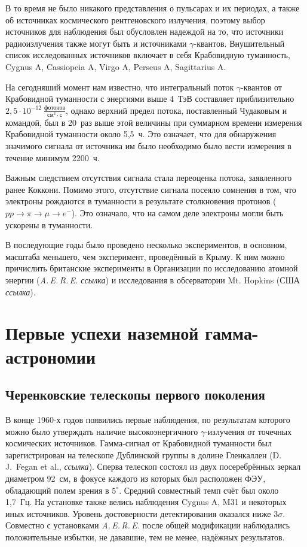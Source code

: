 \documentclass[magd,floatypics,numeref]{msudipl} %
\begin{document}
В то время не было никакого представления о пульсарах и их периодах, а также об источниках космического рентгеновского излучения, поэтому выбор источников для наблюдения был обусловлен надеждой на то, что источники радиоизлучения также могут быть и источниками $\gamma$-квантов. Внушительный список исследованных источников включает в себя Крабовидную туманность, Cygnus A, Cassiopeia A, Virgo A, Perseus A, Sagittarius A. 

На сегодняший момент нам известно, что интегральный поток $\gamma$-квантов от Крабовидной туманности с энергиями выше 4~ТэВ составляет приблизительно~$2,5\cdot10^{-12}~\frac{\text{фотонов}}{\text{см}^2\cdot\text{с}}$, однако верхний предел потока, поставленный Чудаковым и командой, был в 20~раз выше этой величины при суммарном времени измерения Крабовидной туманности около 5,5~ч. Это означает, что для обнаружения значимого сигнала от источника им было необходимо было вести измерения в течение минимум 2200~ч.

Важным следствием отсутствия сигнала стала переоценка потока, заявленного ранее Коккони. Помимо этого, отсутствие сигнала посеяло сомнения в том, что электроны рождаются в туманности в результате столкновения протонов ($pp \rightarrow\pi\rightarrow\mu\rightarrow e^-$). Это означало, что на самом деле электроны могли быть ускорены в туманности. 

В последующие годы было проведено несколько экспериментов, в основном, масштаба меньшего, чем эксперимент, проведённый в Крыму. К ним можно причислить британские эксперименты в Организации по исследованию атомной энергии (\textit{A.\,E.\,R.\,E.  ссылка}) и исследования в обсерватории Mt. Hopkins (США \textit{ссылка}).

\section{Первые успехи наземной гамма-астрономии}
\subsection{Черенковские телескопы первого поколения}
В конце 1960-х годов появились первые наблюдения, по результатам которого можно было утверждать наличие высокоэнергичного $\gamma$-излучения от точечных космических источников. Гамма-сигнал от Крабовидной туманности был зарегистрирован на телескопе Дублинской группы в долине Гленкаллен (D.\,J.~Fegan et al., \textit{ссылка}). Сперва телескоп состоял из двух посеребрённых зеркал диаметром 92~см, в фокусе каждого из которых был расположен ФЭУ, обладающий полем зрения в $5^{\circ}$. Средний совместный темп счёт был около 1,7~Гц. На установке также велись наблюдения Cygnus A, M31 и некоторых иных источников. Уровень достоверности детектирования оказался ниже $3\sigma$. Совместно с установками \textit{A.\,E.\,R.\,E.} после общей модификации наблюдались положительные избытки, не дававшие, тем не менее, надёжных результатов. 
\end{document}
